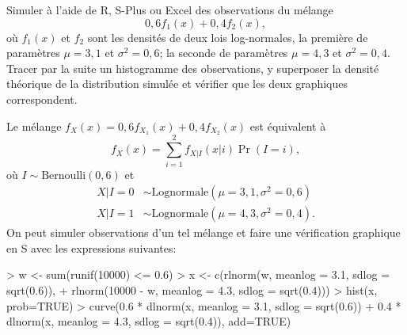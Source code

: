 \begin{exercice}
  Simuler à l'aide de \textsf{R}, S-Plus ou Excel des observations du
  mélange
  \begin{displaymath}
    0,6 f_1(x) + 0,4 f_2(x),
  \end{displaymath}
  où $f_1(x)$ et $f_2$ sont les densités de deux lois log-normales, la
  première de paramètres $\mu = 3,1$ et $\sigma^2 = 0,6$; la seconde
  de paramètres $\mu = 4,3$ et $\sigma^2 = 0,4$.  Tracer par la suite
  un histogramme des observations, y superposer la densité théorique
  de la distribution simulée et vérifier que les deux graphiques
  correspondent.
  \begin{sol}
    Le mélange $f_X(x) = 0,6 f_{X_1}(x) + 0,4 f_{X_2}(x)$ est
    équivalent à
    \begin{displaymath}
      f_X(x) = \sum_{i=1}^2 f_{X|I}(x|i) \Pr(I = i),
    \end{displaymath}
    où $I \sim \text{Bernoulli}(0,6)$ et
    \begin{align*}
      X|I = 0 &\sim \text{Lognormale}(\mu = 3,1, \sigma^2 = 0,6) \\
      X|I = 1 &\sim \text{Lognormale}(\mu = 4,3, \sigma^2 = 0,4).
    \end{align*}
    On peut simuler  observations d'un tel mélange et
    faire une vérification graphique en S avec les expressions suivantes:
\begin{Schunk}
\begin{Sinput}
> w <- sum(runif(10000) <= 0.6)
> x <- c(rlnorm(w, meanlog = 3.1, sdlog = sqrt(0.6)),
+        rlnorm(10000 - w, meanlog = 4.3, sdlog = sqrt(0.4)))
> hist(x, prob=TRUE)
> curve(0.6 * dlnorm(x, meanlog = 3.1, sdlog = sqrt(0.6)) + 0.4 * dlnorm(x, meanlog = 4.3, sdlog = sqrt(0.4)), add=TRUE)
\end{Sinput}
\end{Schunk}
  \end{sol}
\end{exercice}

